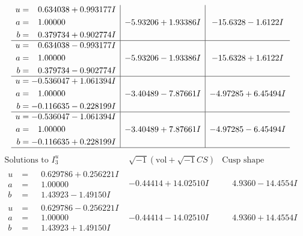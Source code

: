 \documentclass[1p]{elsarticle_modified}
\theoremstyle{definition}
\newcommand{\I}{\sqrt{-1}}
\begin{document}
$$\begin{array}{c|c|c}
\begin{aligned}
u &= \phantom{-}0.634038 + 0.993177 I \\
a &= \phantom{-}1.00000\phantom{ +0.000000I} \\
b &= \phantom{-}0.379734 + 0.902774 I\end{aligned}
 & -5.93206 + 1.93386 I & -15.6328 - 1.6122 I \\ \hline\begin{aligned}
u &= \phantom{-}0.634038 - 0.993177 I \\
a &= \phantom{-}1.00000\phantom{ +0.000000I} \\
b &= \phantom{-}0.379734 - 0.902774 I\end{aligned}
 & -5.93206 - 1.93386 I & -15.6328 + 1.6122 I \\ \hline\begin{aligned}
u &= -0.536047 + 1.061394 I \\
a &= \phantom{-}1.00000\phantom{ +0.000000I} \\
b &= -0.116635 - 0.228199 I\end{aligned}
 & -3.40489 - 7.87661 I & -4.97285 + 6.45494 I \\ \hline\begin{aligned}
u &= -0.536047 - 1.061394 I \\
a &= \phantom{-}1.00000\phantom{ +0.000000I} \\
b &= -0.116635 + 0.228199 I\end{aligned}
 & -3.40489 + 7.87661 I & -4.97285 - 6.45494 I\\
 \hline 
 \end{array}$$\newpage$$\begin{array}{c|c|c}  
\text{Solutions to }I^u_{3}& \I (\text{vol} + \sqrt{-1}CS) & \text{Cusp shape}\\
 \hline 
\begin{aligned}
u &= \phantom{-}0.629786 + 0.256221 I \\
a &= \phantom{-}1.00000\phantom{ +0.000000I} \\
b &= \phantom{-}1.43923 - 1.49150 I\end{aligned}
 & -0.44414 + 14.02510 I & \phantom{-}4.9360 - 14.4554 I \\ \hline\begin{aligned}
u &= \phantom{-}0.629786 - 0.256221 I \\
a &= \phantom{-}1.00000\phantom{ +0.000000I} \\
b &= \phantom{-}1.43923 + 1.49150 I\end{aligned}
 & -0.44414 - 14.02510 I & \phantom{-}4.9360 + 14.4554 I \\ \hline\begin{aligned}

\end{aligned}
\end{array}$$
\end{document}
